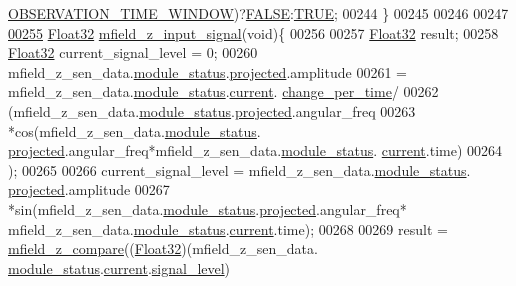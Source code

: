\begin{DoxyCode}
      \hyperlink{a00019_a2fb6f38d16f4ccb6a19773d6a254f512}{OBSERVATION\_TIME\_WINDOW})?\hyperlink{a00040_aa93f0eb578d23995850d61f7d61c55c1}{FALSE}:\hyperlink{a00040_aa8cecfc5c5c054d2875c03e77b7be15d}{TRUE};
00244 \}
00245 
00246 
00247 
\hypertarget{a00053_source_l00255}{}\hyperlink{a00053_a30e963041fabe45400803a40cc920b85}{00255} \hyperlink{a00072_a87d38f886e617ced2698fc55afa07637}{Float32} \hyperlink{a00053_a30e963041fabe45400803a40cc920b85}{mfield\_z\_input\_signal}(\textcolor{keywordtype}{void})\{
00256 
00257     \hyperlink{a00072_a87d38f886e617ced2698fc55afa07637}{Float32} result;
00258     \hyperlink{a00072_a87d38f886e617ced2698fc55afa07637}{Float32} current\_signal\_level = 0;
00260               mfield\_z\_sen\_data.\hyperlink{a00027_adfab5a5d8b45a93dfb13edb24e2b80e3}{module\_status}.\hyperlink{a00019_af2267fb093fb5dcaa006a570a6da3b6b}{projected}.amplitude
00261               = mfield\_z\_sen\_data.\hyperlink{a00027_adfab5a5d8b45a93dfb13edb24e2b80e3}{module\_status}.\hyperlink{a00019_acf41ffc11da291c2f9f0fcb02ee72b98}{current}.
      \hyperlink{a00019_a0f645dd76b41adc6a966feba8e4bff8c}{change\_per\_time}/
00262                      (mfield\_z\_sen\_data.\hyperlink{a00027_adfab5a5d8b45a93dfb13edb24e2b80e3}{module\_status}.\hyperlink{a00019_af2267fb093fb5dcaa006a570a6da3b6b}{projected}.angular\_freq
00263                       *cos(mfield\_z\_sen\_data.\hyperlink{a00027_adfab5a5d8b45a93dfb13edb24e2b80e3}{module\_status}.
      \hyperlink{a00019_af2267fb093fb5dcaa006a570a6da3b6b}{projected}.angular\_freq*mfield\_z\_sen\_data.\hyperlink{a00027_adfab5a5d8b45a93dfb13edb24e2b80e3}{module\_status}.
      \hyperlink{a00019_acf41ffc11da291c2f9f0fcb02ee72b98}{current}.time)
00264                       );
00265 
00266              current\_signal\_level = mfield\_z\_sen\_data.\hyperlink{a00027_adfab5a5d8b45a93dfb13edb24e2b80e3}{module\_status}.
      \hyperlink{a00019_af2267fb093fb5dcaa006a570a6da3b6b}{projected}.amplitude
00267                *sin(mfield\_z\_sen\_data.\hyperlink{a00027_adfab5a5d8b45a93dfb13edb24e2b80e3}{module\_status}.\hyperlink{a00019_af2267fb093fb5dcaa006a570a6da3b6b}{projected}.angular\_freq*
      mfield\_z\_sen\_data.\hyperlink{a00027_adfab5a5d8b45a93dfb13edb24e2b80e3}{module\_status}.\hyperlink{a00019_acf41ffc11da291c2f9f0fcb02ee72b98}{current}.time);
00268 
00269           result =  \hyperlink{a00053_a1dac7e7549c1a5b33e90e7a53f63bf5b}{mfield\_z\_compare}((\hyperlink{a00072_a87d38f886e617ced2698fc55afa07637}{Float32})(mfield\_z\_sen\_data.
      \hyperlink{a00027_adfab5a5d8b45a93dfb13edb24e2b80e3}{module\_status}.\hyperlink{a00019_acf41ffc11da291c2f9f0fcb02ee72b98}{current}.\hyperlink{a00019_a4070db8eab0ff93e3fbc1df59872f117}{signal\_level})

\end{DoxyCode}
